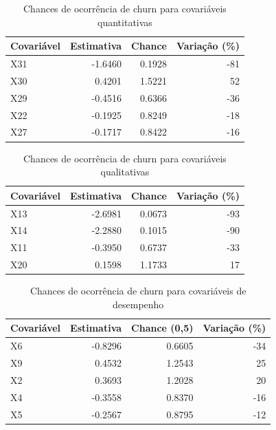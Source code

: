\documentclass[twocolumn]{rbef}
\newcommand{\1}{\mathbbm{1}}
\begin{document}
\begin{table}

\caption{\label{tab:oddsnumericas}Chances de ocorrência de churn para covariáveis quantitativas}
\centering
\fontsize{9}{11}\selectfont
\begin{tabular}[t]{lrrr}
\toprule
Covariável & Estimativa & Chance & Variação (\%)\\
\midrule
X31 & -1.6460 & 0.1928 & -81\\
X30 & 0.4201 & 1.5221 & 52\\
X29 & -0.4516 & 0.6366 & -36\\
X22 & -0.1925 & 0.8249 & -18\\
X27 & -0.1717 & 0.8422 & -16\\
\bottomrule
\end{tabular}
\end{table}

\begin{table}

\caption{\label{tab:oddsbinarias}Chances de ocorrência de churn para covariáveis qualitativas}
\centering
\fontsize{9}{11}\selectfont
\begin{tabular}[t]{lrrr}
\toprule
Covariável & Estimativa & Chance & Variação (\%)\\
\midrule
X13 & -2.6981 & 0.0673 & -93\\
X14 & -2.2880 & 0.1015 & -90\\
X11 & -0.3950 & 0.6737 & -33\\
X20 & 0.1598 & 1.1733 & 17\\
\bottomrule
\end{tabular}
\end{table}

\begin{table}

\caption{\label{tab:oddsmetricas}Chances de ocorrência de churn para covariáveis de desempenho}
\centering
\fontsize{9}{11}\selectfont
\begin{tabular}[t]{lrrr}
\toprule
Covariável & Estimativa & Chance (0,5) & Variação (\%)\\
\midrule
X6 & -0.8296 & 0.6605 & -34\\
X9 & 0.4532 & 1.2543 & 25\\
X2 & 0.3693 & 1.2028 & 20\\
X4 & -0.3558 & 0.8370 & -16\\
X5 & -0.2567 & 0.8795 & -12\\
\bottomrule
\end{tabular}
\end{table}
\end{document}
